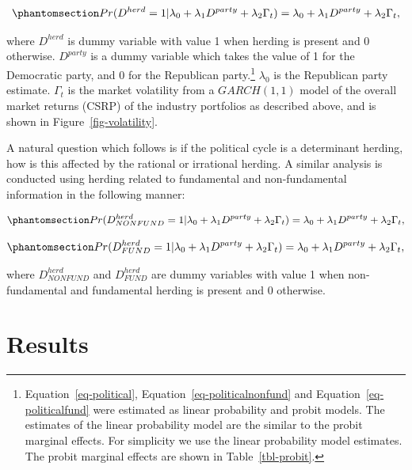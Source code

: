 \documentclass[
  letterpaper,
  DIV=11,
  numbers=noendperiod]{scrartcl}
\begin{document}
\begin{equation}\phantomsection\label{eq-political}{Pr(D^{herd} = 1 |\lambda_0 +  \lambda_1D^{party}  + \lambda_2\Gamma_t) = \lambda_0 +  \lambda_1D^{party}  + \lambda_2\Gamma_t,}\end{equation}

where \(D^{herd}\) is dummy variable with value 1 when herding is
present and 0 otherwise. \(D^{party}\) is a dummy variable which takes
the value of 1 for the Democratic party, and 0 for the Republican
party.\footnote{Equation~\ref{eq-political},
  Equation~\ref{eq-politicalnonfund} and Equation~\ref{eq-politicalfund}
  were estimated as linear probability and probit models. The estimates
  of the linear probability model are the similar to the probit marginal
  effects. For simplicity we use the linear probability model estimates.
  The probit marginal effects are shown in Table~\ref{tbl-probit}.}
\(\lambda_0\) is the Republican party estimate. \(\Gamma_t\) is the
market volatility from a \(GARCH(1,1)\) model of the overall market
returns (CSRP) of the industry portfolios as described above, and is
shown in Figure~\ref{fig-volatility}.

A natural question which follows is if the political cycle is a
determinant herding, how is this affected by the rational or irrational
herding. A similar analysis is conducted using herding related to
fundamental and non-fundamental information in the following manner:

\begin{equation}\phantomsection\label{eq-politicalnonfund}{
Pr(D^{herd}_{NONFUND} = 1 |\lambda_0 +  \lambda_1D^{party}  + \lambda_2\Gamma_t) = \lambda_0 +  \lambda_1D^{party}  + \lambda_2\Gamma_t,
}\end{equation}

\begin{equation}\phantomsection\label{eq-politicalfund}{Pr(D^{herd}_{FUND}= 1 |\lambda_0 +  \lambda_1D^{party}  + \lambda_2\Gamma_t) = \lambda_0 +  \lambda_1D^{party}  + \lambda_2\Gamma_t,}\end{equation}

where \(D^{herd}_{NONFUND}\) and \(D^{herd}_{FUND}\) are dummy variables
with value 1 when non-fundamental and fundamental herding is present and
0 otherwise.

\newpage

\section{Results}\label{results}
\end{document}
